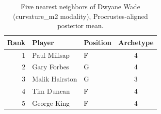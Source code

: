 \begin{table}[htbp]
  \centering\small
  \begin{tabular}{rllc}
    \toprule
    Rank & Player & Position & Archetype \\
    \midrule
    1 & Paul Millsap & F & 4 \\
    2 & Gary Forbes & G & 4 \\
    3 & Malik Hairston & G & 3 \\
    4 & Tim Duncan & F & 4 \\
    5 & George King & F & 4 \\
    \bottomrule
  \end{tabular}
  \caption{Five nearest neighbors of Dwyane Wade (curvature_m2 modality), Procrustes-aligned posterior mean.}
  \label{tab:Dwyane_Wade_neighbors_curvature_m2}
\end{table}

